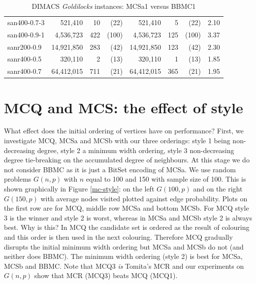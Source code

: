 \documentclass{l4proj}
\begin{document}
\begin{table}
\begin{center}
\begin{scriptsize}
\begin{tabular}{|l|r r r|r r r|c|}
san400-0.7-3 & 521,410 & 10 & (22) & 521,410 & 5 & (22) & 2.10   \\ 
san400-0.9-1 & 4,536,723 & 422 & (100) & 4,536,723 & 125 & (100) & 3.37   \\ 
sanr200-0.9 & 14,921,850 & 283 & (42) & 14,921,850 & 123 & (42) & 2.30   \\ 
sanr400-0.5 & 320,110 & 2 & (13) & 320,110 & 1 & (13) & 1.85   \\ 
sanr400-0.7 & 64,412,015 & 711 & (21) & 64,412,015 & 365 & (21) & 1.95   \\ \hline
\end{tabular}
\end{scriptsize}
\end{center}
\caption{DIMACS \emph{Goldilocks} instances: MCSa1 versus BBMC1}
\label{tableMCSvBBMC}
\end{table}


\section{MCQ and MCS: the effect of style}
What effect does the initial ordering of vertices have on performance? First, we investigate MCQ, MCSa and MCSb with our three orderings:
style 1 being non-decreasing degree, style 2 a minimum width ordering, style 3 non-decreasing degree tie-breaking
on the accumulated degree of neighbours. At this stage we do not consider BBMC as it is just a BitSet encoding of MCSa.
We use random problems $G(n,p)$ with $n$ equal to 100 and 150 with sample size of 100.
This is shown graphically in Figure \ref{mc-style}: on the left $G(100,p)$ and on the right $G(150,p)$ with average nodes visited plotted against
edge probability. Plots on the first row are for MCQ, middle row MCSa and bottom MCSb. For MCQ style 3 is the winner and 
style 2 is worst, whereas in MCSa and MCSb style 2 is always best. Why is this? In MCQ the candidate set is
ordered as the result of colouring and this order is then used in the next colouring. Therefore MCQ gradually disrupts the initial 
minimum width ordering but MCSa and MCSb do not (and neither does BBMC). 
The minimum width ordering (style 2) is best for MCSa, MCSb and BBMC. Note that MCQ3 \emph{is} Tomita's MCR \cite{tomita2007} and our
experiments on $G(n,p)$ show that MCR (MCQ3) beats MCQ (MCQ1).
\end{document}
